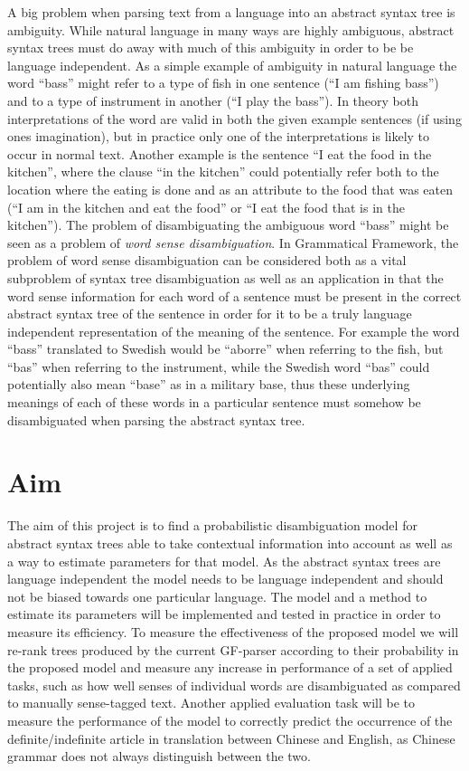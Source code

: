 A big problem when parsing text from a language into an abstract syntax tree is ambiguity. While natural language in many ways are highly ambiguous, abstract syntax trees must do away with much of this ambiguity in order to be be language independent. As a simple example of ambiguity in natural language the word ``bass'' might refer to a type of fish in one sentence (``I am fishing bass'') and to a type of instrument in another (``I play the bass''). In theory both interpretations of the word are valid in both the given example sentences (if using ones imagination), but in practice only one of the interpretations is likely to occur in normal text. Another example is the sentence ``I eat the food in the kitchen'', where the clause ``in the kitchen'' could potentially refer both to the location where the eating is done and as an attribute to the food that was eaten (``I am in the kitchen and eat the food'' or ``I eat the food that is in the kitchen''). The problem of disambiguating the ambiguous word ``bass'' might be seen as a problem of \emph{word sense disambiguation}. In Grammatical Framework, the problem of word sense disambiguation can be considered both as a vital subproblem of syntax tree disambiguation as well as an application in that the word sense information for each word of a sentence must be present in the correct abstract syntax tree of the sentence in order for it to be a truly language independent representation of the meaning of the sentence. For example the word ``bass'' translated to Swedish would be ``aborre'' when referring to the fish, but ``bas'' when referring to the instrument, while the Swedish word ``bas'' could potentially also mean ``base'' as in a military base, thus these underlying meanings of each of these words in a particular sentence must somehow be disambiguated when parsing the abstract syntax tree. 

\section{Aim}
The aim of this project is to find a probabilistic disambiguation model for abstract syntax trees able to take contextual information into account as well as a way to estimate parameters for that model. As the abstract syntax trees are language independent the model needs to be language independent and should not be biased towards one particular language. The model and a method to estimate its parameters will be implemented and tested in practice in order to measure its efficiency. To measure the effectiveness of the proposed model we will re-rank trees produced by the current GF-parser according to their probability in the proposed model and measure any increase in performance of a set of applied tasks, such as how well senses of individual words are disambiguated as compared to manually sense-tagged text. Another applied evaluation task will be to measure the performance of the model to correctly predict the occurrence of the definite/indefinite article in translation between Chinese and English, as Chinese grammar does not always distinguish between the two.
